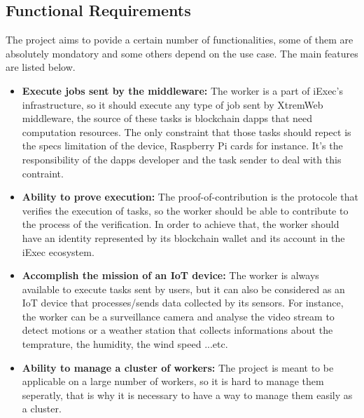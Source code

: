     \subsection{Functional Requirements}
        The project aims to povide a certain number of functionalities, some of them are absolutely mondatory
        and some others depend on the use case. The main features are listed below.
        \begin{itemize}
            \item \textbf{Execute jobs sent by the middleware:} The worker is a part of iExec's infrastructure, so it
            should execute any type of job sent by XtremWeb middleware, the source of these tasks is blockchain
            dapps that need computation resources. The only constraint that those tasks should repect is the
            specs limitation of the device, Raspberry Pi cards for instance. It's the responsibility of
            the dapps developer and the task sender to deal with this contraint.

            \item \textbf{Ability to prove execution:} The proof-of-contribution\cite{POCO} is the protocole that
            verifies the execution of tasks, so the worker should be able to contribute to the process of the
            verification. In order to achieve that, the worker should have an identity represented by its
            blockchain wallet and its account in the iExec ecosystem.

            \item \textbf{Accomplish the mission of an IoT device:} The worker is always available to execute tasks sent by
            users, but it can also be considered as an IoT device that processes/sends data collected by its sensors.
            For instance, the worker can be a surveillance camera and analyse the video stream to detect motions or
            a weather station that collects informations about the temprature, the humidity, the wind speed ...etc.

            \item \textbf{Ability to manage a cluster of workers:} The project is meant to be applicable on a large number of
            workers, so it is hard to manage them seperatly, that is why it is necessary to have a way to manage them
            easily as a cluster.
        \end{itemize}

